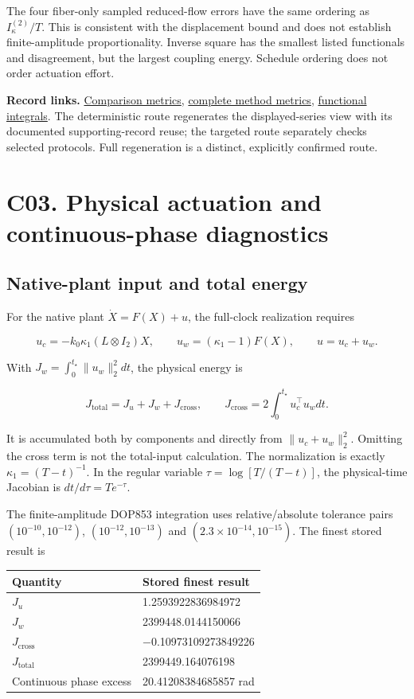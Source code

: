 \documentclass[11pt,a4paper]{article}
\begin{document}
The four fiber-only sampled reduced-flow errors have the same ordering
as \(I_\kappa^{(2)}/T\). This is consistent with the displacement bound
and does not establish finite-amplitude proportionality. Inverse square
has the smallest listed functionals and disagreement, but the largest
coupling energy. Schedule ordering does not order actuation effort.

\textbf{Record links.}
\href{../data/records/comparison_metrics.csv}{Comparison metrics},
\href{../data/records/method_metrics.csv}{complete method metrics},
\href{../data/records/functional_hierarchy_values.csv}{functional
integrals}. The deterministic route regenerates the displayed-series
view with its documented supporting-record reuse; the targeted route
separately checks selected protocols. Full regeneration is a distinct,
explicitly confirmed route.

\section{C03. Physical actuation and continuous-phase
diagnostics}\label{c03}

\subsection{Native-plant input and total energy}\label{c03-energy}

For the native plant \(\dot X=F(X)+u\), the full-clock realization
requires

\[
u_c=-k_0\kappa_1(L\otimes I_2)X,\qquad
u_w=(\kappa_1-1)F(X),\qquad u=u_c+u_w.
\]

With \(J_w=\int_0^{t_\star}\|u_w\|_2^2dt\), the physical energy is

\[
J_{\mathrm{total}}=J_u+J_w+J_{\mathrm{cross}},\qquad
J_{\mathrm{cross}}=2\int_0^{t_\star}u_c^\top u_wdt. \tag{E03}
\]

It is accumulated both by components and directly from
\(\|u_c+u_w\|_2^2\). Omitting the cross term is not the total-input
calculation. The normalization is exactly \(\kappa_1=(T-t)^{-1}\). In
the regular variable \(\tau=\log[T/(T-t)]\), the physical-time Jacobian
is \(dt/d\tau=Te^{-\tau}\).

The finite-amplitude DOP853 integration uses relative/absolute tolerance
pairs \((10^{-10},10^{-12})\), \((10^{-12},10^{-13})\) and
\((2.3\times10^{-14},10^{-15})\). The finest stored result is

\begin{longtable}[]{@{}ll@{}}
\toprule\noalign{}
Quantity & Stored finest result \\
\midrule\noalign{}
\endhead
\bottomrule\noalign{}
\endlastfoot
\(J_u\) & 1.2593922836984972 \\
\(J_w\) & 2399448.0144150066 \\
\(J_{\mathrm{cross}}\) & −0.10973109273849226 \\
\(J_{\mathrm{total}}\) & 2399449.164076198 \\
Continuous phase excess & 20.41208384685857 rad \\
\end{longtable}
\end{document}
